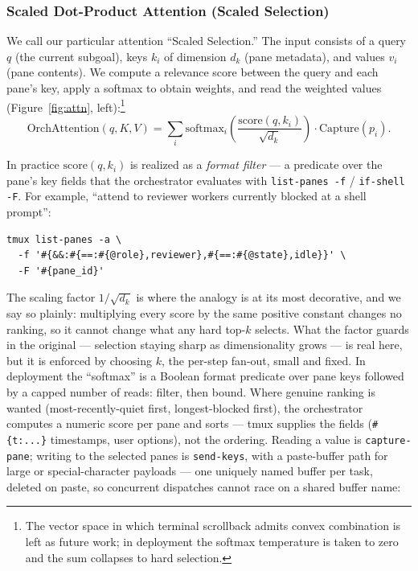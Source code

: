 \documentclass[10pt]{article}
\newcommand{\code}[1]{\texttt{\small #1}}
\begin{document}
\subsubsection{Scaled Dot-Product Attention (Scaled Selection)}\label{sec:sdpa}

We call our particular attention ``Scaled Selection.'' The input consists of a query
$q$ (the current subgoal), keys $k_i$ of dimension $d_k$ (pane metadata), and values
$v_i$ (pane contents). We compute a relevance score between the query and each pane's
key, apply a softmax to obtain weights, and read the weighted values
(Figure~\ref{fig:attn}, left):\footnote{The vector space in which terminal
scrollback admits convex combination is left as future work; in deployment the
softmax temperature is taken to zero and the sum collapses to hard selection.}
\begin{equation}
\mathrm{OrchAttention}(q,K,V) =
  \sum_{i} \mathrm{softmax}_i\!\left(\frac{\mathrm{score}(q,k_i)}{\sqrt{d_k}}\right)
  \cdot \mathrm{Capture}(p_i).
\end{equation}

In practice $\mathrm{score}(q,k_i)$ is realized as a \emph{format filter} --- a
predicate over the pane's key fields that the orchestrator evaluates with
\code{list-panes -f} / \code{if-shell -F}. For example, ``attend to reviewer workers
currently blocked at a shell prompt'':

\begin{lstlisting}
tmux list-panes -a \
  -f '#{&&:#{==:#{@role},reviewer},#{==:#{@state},idle}}' \
  -F '#{pane_id}'
\end{lstlisting}

The scaling factor $1/\sqrt{d_k}$ is where the analogy is at its most decorative,
and we say so plainly: multiplying every score by the same positive constant changes
no ranking, so it cannot change what any hard top-$k$ selects. What the factor
guards in the original --- selection staying sharp as dimensionality grows --- is
real here, but it is enforced by choosing $k$, the per-step fan-out, small and
fixed. In deployment the ``softmax'' is a Boolean format predicate over pane keys
followed by a capped number of reads: filter, then bound. Where genuine ranking is
wanted (most-recently-quiet first, longest-blocked first), the orchestrator computes
a numeric score per pane and sorts --- tmux supplies the fields (\code{\#\{t:...\}}
timestamps, user options), not the ordering. Reading a value is
\code{capture-pane}; writing to the selected panes is \code{send-keys}, with a
paste-buffer path for large or special-character payloads --- one uniquely named
buffer per task, deleted on paste, so concurrent dispatches cannot race on a shared
buffer name:
\end{document}
